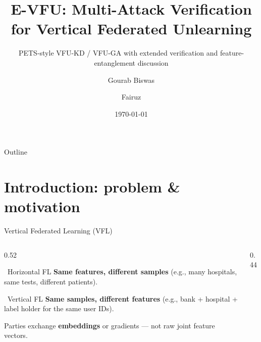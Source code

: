 \documentclass[aspectratio=169, 11pt]{beamer}
\title[E-VFU]{E-VFU: Multi-Attack Verification for Vertical Federated Unlearning}
\subtitle{PETS-style \textsc{VFU-KD} / \textsc{VFU-GA} with extended verification and feature-entanglement discussion}
\author{Gourab Biswas \and Fairuz}
\institute{Undergraduate machine learning project}
\date{\today}
\begin{document}
\begin{frame}
  \titlepage
\end{frame}

\begin{frame}{Outline}
  \tableofcontents
\end{frame}

\section{Introduction: problem \& motivation}

\begin{frame}{Vertical Federated Learning (VFL)}
  \begin{columns}[T]
    \begin{column}{0.52\textwidth}
      \begin{block}{\faArrowsAltH\ Horizontal FL}
        \textbf{Same features, different samples} (e.g., many hospitals, same tests, different patients).
      \end{block}
      \vspace{0.35em}
      \begin{exampleblock}{\faArrowsAltV\ Vertical FL}
        \textbf{Same samples, different features} (e.g., bank + hospital + label holder for the same user IDs).
      \end{exampleblock}
      \vspace{0.35em}
      Parties exchange \textbf{embeddings} or gradients --- not raw joint feature vectors.
    \end{column}
    \begin{column}{0.44\textwidth}
      \begin{center}
      \end{center}
    \end{column}
  \end{columns}
\end{frame}
\end{document}
